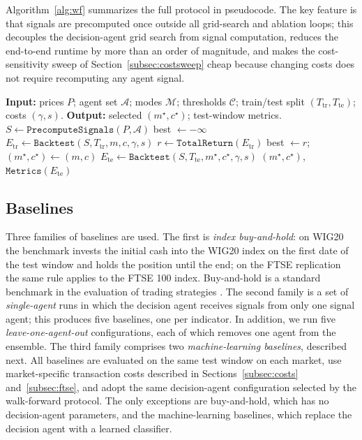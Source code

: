 \documentclass{ieeeaccess}
\begin{document}
Algorithm~\ref{alg:wf} summarizes the full protocol in pseudocode. The key feature is that signals are precomputed once outside all grid-search and ablation loops; this decouples the decision-agent grid search from signal computation, reduces the end-to-end runtime by more than an order of magnitude, and makes the cost-sensitivity sweep of Section~\ref{subsec:costsweep} cheap because changing costs does not require recomputing any agent signal.

\begin{algorithm}[t]
\caption{Anchored walk-forward with precomputed signals}
\label{alg:wf}
\begin{algorithmic}[1]
\STATE \textbf{Input:} prices $P$; agent set $\mathcal{A}$; modes $\mathcal{M}$; thresholds $\mathcal{C}$; train/test split $(T_\text{tr}, T_\text{te})$; costs $(\gamma, s)$.
\STATE \textbf{Output:} selected $(m^\star, c^\star)$; test-window metrics.
\STATE $S \gets \mathtt{PrecomputeSignals}(P, \mathcal{A})$ 
\STATE best $\gets -\infty$
  \STATE $E_\text{tr} \gets \mathtt{Backtest}(S, T_\text{tr}, m, c, \gamma, s)$
  \STATE $r \gets \mathtt{TotalReturn}(E_\text{tr})$
    \STATE best $\gets r$; $(m^\star, c^\star) \gets (m, c)$
  \ENDIF
\ENDFOR
\STATE $E_\text{te} \gets \mathtt{Backtest}(S, T_\text{te}, m^\star, c^\star, \gamma, s)$
\RETURN $(m^\star, c^\star)$, $\mathtt{Metrics}(E_\text{te})$
\end{algorithmic}
\end{algorithm}

\subsection{Baselines}
\label{subsec:baselines}

Three families of baselines are used. The first is \emph{index buy-and-hold}: on WIG20 the benchmark invests the initial cash into the WIG20 index on the first date of the test window and holds the position until the end; on the FTSE replication the same rule applies to the FTSE 100 index. Buy-and-hold is a standard benchmark in the evaluation of trading strategies \cite{dichtl2020}. The second family is a set of \emph{single-agent} runs in which the decision agent receives signals from only one signal agent; this produces five baselines, one per indicator. In addition, we run five \emph{leave-one-agent-out} configurations, each of which removes one agent from the ensemble. The third family comprises two \emph{machine-learning baselines}, described next. All baselines are evaluated on the same test window on each market, use market-specific transaction costs described in Sections~\ref{subsec:costs} and~\ref{subsec:ftse}, and adopt the same decision-agent configuration selected by the walk-forward protocol. The only exceptions are buy-and-hold, which has no decision-agent parameters, and the machine-learning baselines, which replace the decision agent with a learned classifier.
\end{document}
